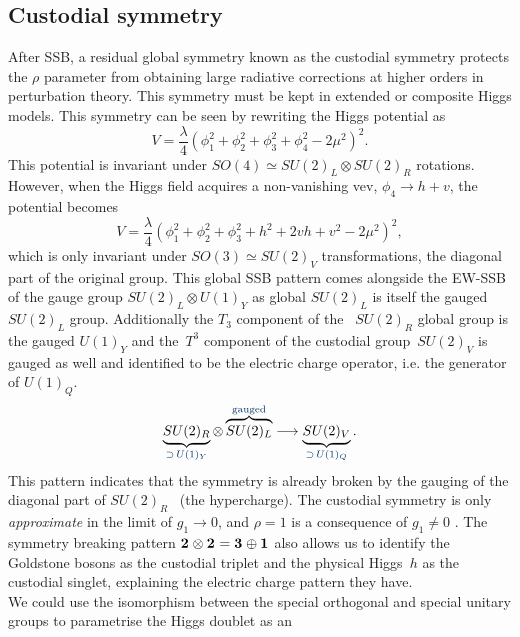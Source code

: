 \subsection{Custodial symmetry}
After SSB, a residual global symmetry known as the custodial symmetry protects the $\rho$ parameter from obtaining large radiative corrections at higher orders in perturbation theory.  This symmetry must be kept in extended or composite Higgs models. This symmetry can be seen by rewriting the Higgs potential as
\begin{equation}
	V = \frac{\lambda}{4} \left( \phi_1^2+\phi^2_2+\phi_3^2+\phi^2_4 -2 \mu^2\right)^2.
\end{equation}
This potential is invariant under $SO(4)\simeq SU(2)_L \otimes SU(2)_R$ rotations. However, when the Higgs field acquires a non-vanishing vev,  $ \phi_4 \to h+v$, the potential becomes
 \begin{equation}
 	V = \frac{\lambda}{4} \left( \phi_1^2+\phi^2_2+\phi_3^2+ h^2+2vh+v^2 -2 \mu^2\right)^2,
 \end{equation}
which is only invariant under  $SO(3)\simeq SU(2)_V$ transformations, the diagonal part of the original group. This global SSB pattern comes alongside the EW-SSB of the gauge group $SU(2)_L \otimes U(1)_Y$ as global $SU(2)_L$ is itself the gauged $SU(2)_L$  group. Additionally the $T_3$ component of the ~$SU(2)_R$ global group is the gauged $U(1)_Y$ and the~$T^3$ component of the custodial group~$SU(2)_V$ is gauged as well and identified to be the electric charge operator, i.e. the generator of $U(1)_Q$. 
\begin{equation}
	\underbrace{SU(2)_R}_{{\color{myblue} \supset\, U(1)_Y}} \otimes \overbrace{SU(2)_L}^{{\color{myblue} \text{gauged}}} \longrightarrow \underbrace{SU(2)_V}_{{\color{myblue} \supset\, U(1)_Q}} .
\end{equation}
This pattern indicates that the symmetry is already broken by the gauging of the diagonal part of $SU(2)_R$ ~(the hypercharge). The custodial symmetry is only \emph{approximate} in the limit of $ g_1 \to 0$, and $\rho=1$ is a consequence of $g_1\neq 0$ . The symmetry breaking pattern $\irrep{2} \otimes \irrep{2} = \irrep{3} \oplus \irrep{1}$ also allows us to identify the Goldstone bosons as the custodial triplet and the physical Higgs~$h$ as the custodial singlet, explaining the electric charge pattern they have.   \\
 We could use the isomorphism between the special orthogonal and special unitary groups to parametrise the Higgs doublet as an 
